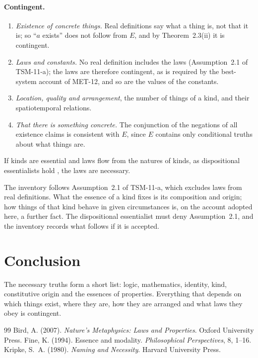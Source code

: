 \documentclass{situationist-preprint}
\begin{document}
\paragraph{Contingent.}
\begin{enumerate}
\item \emph{Existence of concrete things.} Real definitions say what a thing is, not that it is; so \enquote{$a$ exists} does not follow from $E$, and by Theorem~2.3(ii) it is contingent.
\item \emph{Laws and constants.} No real definition includes the laws (Assumption~2.1 of TSM-11-a); the laws are therefore contingent, as is required by the best-system account of MET-12, and so are the values of the constants.
\item \emph{Location, quality and arrangement}, the number of things of a kind, and their spatiotemporal relations.
\item \emph{That there is something concrete.} The conjunction of the negations of all existence claims is consistent with $E$, since $E$ contains only conditional truths about what things are.
\end{enumerate}

\begin{objection}
If kinds are essential and laws flow from the natures of kinds, as dispositional essentialists hold \citep{Bird2007}, the laws are necessary.
\end{objection}

\begin{reply}
The inventory follows Assumption~2.1 of TSM-11-a, which excludes laws from real definitions. What the essence of a kind fixes is its composition and origin; how things of that kind behave in given circumstances is, on the account adopted here, a further fact. The dispositional essentialist must deny Assumption~2.1, and the inventory records what follows if it is accepted.
\end{reply}

\section{Conclusion}

The necessary truths form a short list: logic, mathematics, identity, kind, constitutive origin and the essences of properties. Everything that depends on which things exist, where they are, how they are arranged and what laws they obey is contingent.

\begin{thebibliography}{99}\small
{} Bird, A. (2007). \emph{Nature's Metaphysics: Laws and Properties}. Oxford University Press.
 Fine, K. (1994). Essence and modality. \emph{Philosophical Perspectives}, 8, 1--16.
 Kripke, S.~A. (1980). \emph{Naming and Necessity}. Harvard University Press.
\end{thebibliography}
\end{document}
